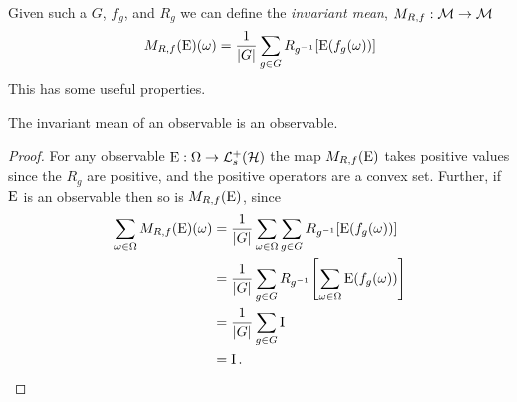 Given such a $G$, $f_g$, and $R_g$ we can define the \emph{invariant mean}, $M_{R,f}:\mathcal{M}\to\mathcal{M}$
\begin{equation}
  M_{R,f}(\operatorname{E})(\omega) = \frac{1}{{\left\lvert{G}\right\rvert}}\sum_{g\in G} R_{g^{-1}}\! \left[\operatorname{E}(f_g(\omega))\right]
\end{equation}
This has some useful properties. 

\begin{lem}\label{lem:inv-mean-obs-to-obs}
  The invariant mean of an observable is an observable.
  \begin{proof}
    For any observable $\ope:\Omega\to\posops[\hcal]$ the map $M_{R,f}(\operatorname{E})$ takes positive values since the $R_g$ are positive, and the positive operators are a convex set. Further, if $\operatorname{E}$ is an observable then so is $M_{R,f}(\operatorname{E})$, since
    \begin{align}
      \sum_{\omega\in\Omega} M_{R,f}(\operatorname{E})(\omega) &= \frac{1}{{\left\lvert{G}\right\rvert}} \sum_{\omega\in\Omega} \sum_{g\in G} R_{g^{-1}}\! \left[\operatorname{E}(f_g(\omega))\right]\\
                                                   &= \frac{1}{{\left\lvert{G}\right\rvert}} \sum_{g\in G} R_{g^{-1}}\! \left[\sum_{\omega\in\Omega}\operatorname{E}(f_g(\omega))\right]\\
                                                   &= \frac{1}{{\left\lvert{G}\right\rvert}} \sum_{g\in G} \operatorname{I}\\
                                                   &= \operatorname{I}.
    \end{align}
  \end{proof}
\end{lem}
